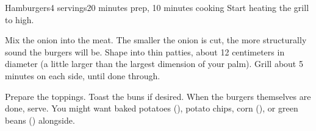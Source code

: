 \documentclass[../Cookbook.tex]{subfiles}
\begin{document}
\begin{recipe}{Hamburgers}{4 servings}{20 minutes prep, 10 minutes cooking}
  Start heating the grill to high.

  Mix the onion into the meat. The smaller the onion is cut, the more structurally sound the burgers will be.
  Shape into thin patties, about 12 centimeters in diameter (a little larger than the largest dimension of your palm).
  Grill about 5 minutes on each side, until done through.

  Prepare the toppings. Toast the buns if desired.
  When the burgers themselves are done, serve. You might want baked potatoes (\pageref{BakedPotato}), potato chips, corn (\pageref{Corn}), or green beans (\pageref{GreenBeans}) alongside.
\end{recipe}
\end{document}
